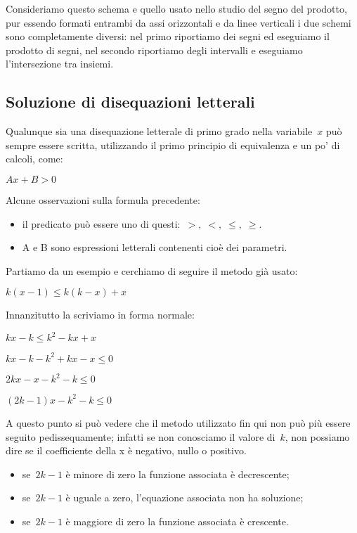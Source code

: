 \osservazione Consideriamo questo schema e quello usato nello studio del
segno del prodotto, pur essendo formati entrambi da assi orizzontali e
da linee verticali i due schemi sono completamente diversi:
nel primo riportiamo dei segni ed eseguiamo il prodotto di segni,
nel secondo riportiamo degli intervalli e eseguiamo l'intersezione tra
insiemi.

\subsection{Soluzione di disequazioni letterali}
\label{sec:dis_tetterali}

Qualunque sia una disequazione letterale di primo grado nella variabile~$x$
può sempre essere scritta, utilizzando il primo principio di equivalenza e un
po' di calcoli, come:

$A x + B > 0$

Alcune osservazioni sulla formula precedente:

\begin{itemize} [noitemsep]
 \item il predicato può essere uno di questi:~$>, \; <, \; \le, \; \ge$.
 \item A e B sono espressioni letterali contenenti cioè dei parametri.
\end{itemize}

Partiamo da un  esempio e cerchiamo di seguire il metodo già usato:

$k \left( x -1 \right )\le k \left ( k - x \right ) + x$

Innanzitutto la scriviamo in forma normale:

$k x - k \le k^2 - k x + x $

$k x - k - k^2 + k x - x \le 0 $

$2 k x - x - k^2 - k \le 0 $

$\left (2 k - 1 \right ) x - k^2 - k \le 0$

A questo punto si può vedere che il metodo utilizzato fin qui non può più
essere seguito pedissequamente; infatti se non conosciamo il valore di~$k$,
non possiamo dire se il coefficiente della x è negativo, nullo o positivo.

\begin{itemize} [noitemsep]
 \item se~$2 k - 1$ è minore di zero la funzione associata è decrescente;
 \item se~$2 k - 1$ è uguale a zero, l'equazione associata non ha soluzione;
 \item se~$2 k - 1$ è maggiore di zero la funzione associata è crescente.
\end{itemize}

